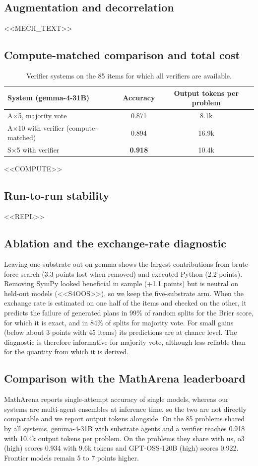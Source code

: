 \documentclass[11pt]{article}
\begin{document}
\subsection{Augmentation and decorrelation}
<<MECH_TEXT>>

\subsection{Compute-matched comparison and total cost}
\begin{table}[h]\centering\small
\begin{tabular}{lcc}\toprule
System (gemma-4-31B) & Accuracy & Output tokens per problem\\\midrule
A$\times$5, majority vote & 0.871 & 8.1k\\
A$\times$10 with verifier (compute-matched) & 0.894 & 16.9k\\
S$\times$5 with verifier & \textbf{0.918} & 10.4k\\\bottomrule
\end{tabular}
\caption{Verifier systems on the 85 items for which all verifiers are available.}
\end{table}
<<COMPUTE>>

\subsection{Run-to-run stability}\label{sec:stability}
<<REPL>>

\subsection{Ablation and the exchange-rate diagnostic}\label{sec:ablation}
Leaving one substrate out on gemma shows the largest contributions from brute-force search (3.3
points lost when removed) and executed Python (2.2 points). Removing SymPy looked beneficial in
sample (+1.1 points) but is neutral on held-out models (<<S4OOS>>), so we keep the five-substrate
arm. When the exchange rate is estimated on one half of the items and checked on the other, it
predicts the failure of generated plans in 99\% of random splits for the Brier score, for which
it is exact, and in 84\% of splits for majority vote. For small gains (below about 3 points with
45 items) its predictions are at chance level. The diagnostic is therefore informative for
majority vote, although less reliable than for the quantity from which it is derived.

\subsection{Comparison with the MathArena leaderboard}
MathArena reports single-attempt accuracy of single models, whereas our systems are multi-agent
ensembles at inference time, so the two are not directly comparable and we report output tokens
alongside. On the 85 problems shared by all systems, gemma-4-31B with substrate agents and a
verifier reaches 0.918 with 10.4k output tokens per problem. On the problems they share with
us, o3 (high) scores 0.934 with 9.6k tokens and GPT-OSS-120B (high) scores 0.922. Frontier models
remain 5 to 7 points higher.
\end{document}
